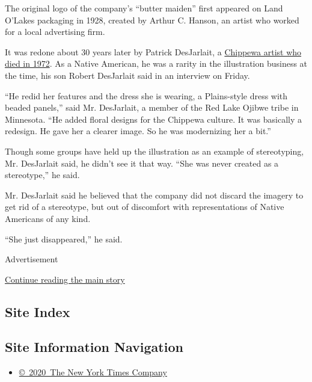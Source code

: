 The original logo of the company's ``butter maiden'' first appeared on
Land O'Lakes packaging in 1928, created by Arthur C. Hanson, an artist
who worked for a local advertising firm.

It was redone about 30 years later by Patrick DesJarlait, a
\href{https://www.nytimes3xbfgragh.onion/1978/02/26/archives/long-island-weekly-art-tradition-presented-with-action-and.html}{Chippewa
artist who died in 1972}. As a Native American, he was a rarity in the
illustration business at the time, his son Robert DesJarlait said in an
interview on Friday.

``He redid her features and the dress she is wearing, a Plains-style
dress with beaded panels,'' said Mr. DesJarlait, a member of the Red
Lake Ojibwe tribe in Minnesota. ``He added floral designs for the
Chippewa culture. It was basically a redesign. He gave her a clearer
image. So he was modernizing her a bit.''

Though some groups have held up the illustration as an example of
stereotyping, Mr. DesJarlait said, he didn't see it that way. ``She was
never created as a stereotype,'' he said.

Mr. DesJarlait said he believed that the company did not discard the
imagery to get rid of a stereotype, but out of discomfort with
representations of Native Americans of any kind.

``She just disappeared,'' he said.

Advertisement

\protect\hyperlink{after-bottom}{Continue reading the main story}

\hypertarget{site-index}{%
\subsection{Site Index}\label{site-index}}

\hypertarget{site-information-navigation}{%
\subsection{Site Information
Navigation}\label{site-information-navigation}}

\begin{itemize}
\tightlist
\item
  \href{https://help.nytimes3xbfgragh.onion/hc/en-us/articles/115014792127-Copyright-notice}{©~2020~The
  New York Times Company}
\end{itemize}

